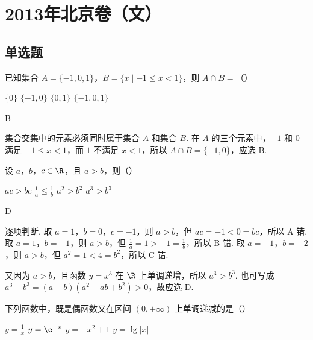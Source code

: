 \chapter{2013年北京卷（文）}

\section{单选题}

\begin{problem}
已知集合 \(A = \{-1, 0, 1\}\)，\(B = \{x \mid -1 \leqslant x < 1\}\)，则 \(A \cap B =\)（\quad）

\choices
    {\(\{0\}\)}
    {\( \{-1,0\} \)}
    {\(\{0,1\}\)}
    {\(\{-1,0,1\}\)}
\end{problem}

\begin{answer}
B
\end{answer}

\begin{solution}
集合交集中的元素必须同时属于集合 \(A\) 和集合 \(B\). 在 \(A\) 的三个元素中，\(-1\) 和 \(0\) 满足 \(-1\leqslant x<1\)，而 \(1\) 不满足 \(x<1\)，所以 \(A\cap B=\{-1,0\}\)，应选 B.
\end{solution}

\begin{problem}
设 \(a\)，\(b\)，\(c \in \R\)，且 \(a > b\)，则（\quad）

\choices
    {\(ac > bc\)}
    {\(\frac{1}{a} \leqslant \frac{1}{b}\)}
    {\(a^2 > b^2\)}
    {\(a^3 > b^3\)}
\end{problem}

\begin{answer}
D
\end{answer}

\begin{solution}
逐项判断. 取 \(a=1\)，\(b=0\)，\(c=-1\)，则 \(a>b\)，但 \(ac=-1<0=bc\)，所以 A 错. 取 \(a=1\)，\(b=-1\)，则 \(a>b\)，但 \(\frac{1}{a}=1>-1=\frac{1}{b}\)，所以 B 错. 取 \(a=-1\)，\(b=-2\)，则 \(a>b\)，但 \(a^2=1<4=b^2\)，所以 C 错.

又因为 \(a>b\)，且函数 \(y=x^3\) 在 \(\R\) 上单调递增，所以 \(a^3>b^3\). 也可写成 \(a^3-b^3=(a-b)(a^2+ab+b^2)>0\)，故应选 D.
\end{solution}

\begin{problem}
下列函数中，既是偶函数又在区间 \((0, +\infty)\) 上单调递减的是（\quad）

\choices
    {\(y = \frac{1}{x}\)}
    {\( y = \e^{-x} \)}
    {\( y = -x^{2} + 1 \)}
    {\(y = \lg |x|\)}
\end{problem}

